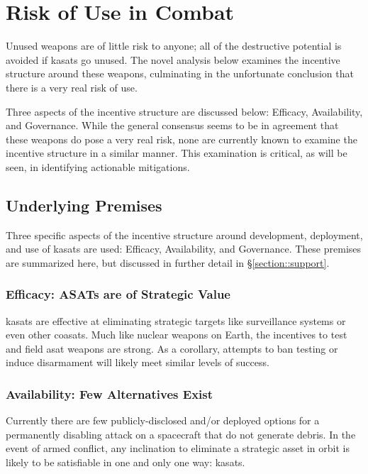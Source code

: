 \section{Risk of Use in Combat}

Unused weapons are of little risk to anyone; all of the destructive
potential is avoided if \acp{kasat} go unused.  The novel analysis
below examines the incentive structure around these weapons,
culminating in the unfortunate conclusion that there is a very real
risk of use.

Three aspects of the incentive structure are discussed below:
Efficacy, Availability, and Governance.  While the general consensus
seems to be in agreement that these weapons do pose a very real risk,
none are currently known to examine the incentive structure in a
similar manner.  This examination is critical, as will be seen, in
identifying actionable mitigations.


\subsection{Underlying Premises}

Three specific aspects of the incentive structure around development,
deployment, and use of \acp{kasat} are used: Efficacy, Availability,
and Governance.  These premises are summarized here, but discussed in
further detail in \S\ref{section::support}.

\subsubsection{Efficacy: ASATs are of Strategic Value}
\acp{kasat} are effective at eliminating strategic targets like
surveillance systems or even other \acp{coasat}.  Much like nuclear
weapons on Earth, the incentives to test and field \ac{asat} weapons
are strong.  As a corollary, attempts to ban testing or induce
disarmament will likely meet similar levels of success.

\subsubsection{Availability: Few Alternatives Exist}
Currently there are few publicly-disclosed and/or deployed options for
a permanently disabling attack on a spacecraft that do not generate
debris.  In the event of armed conflict, any inclination to eliminate
a strategic asset in orbit is likely to be satisfiable in one and only
one way: \acp{kasat}.

